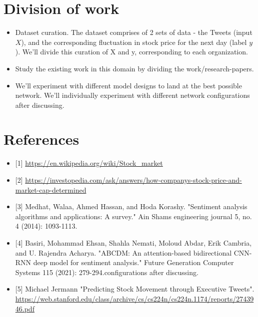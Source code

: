 \documentclass{article}
\begin{document}
\section{Division of work}
\begin{itemize}
    \item Dataset curation. The dataset comprises of 2 sets of data - the Tweets (input $X$), and the corresponding fluctuation in stock price for the next day (label $y$). We'll divide this curation of X and y, corresponding to each organization.
    \item Study the existing work in this domain by dividing the work/research-papers.
    \item We'll experiment with different model designs to land at the best possible network. We'll individually experiment with different network configurations after discussing.
\end{itemize}

\section{References}
\begin{itemize}
    \item {[1]} \url{https://en.wikipedia.org/wiki/Stock_market}
    \item {[2]} \url{https://investopedia.com/ask/answers/how-companys-stock-price-and-market-cap-determined}
    \item {[3]} Medhat, Walaa, Ahmed Hassan, and Hoda Korashy. "Sentiment analysis algorithms and applications: A survey." Ain Shams engineering journal 5, no. 4 (2014): 1093-1113.
    \item {[4]} Basiri, Mohammad Ehsan, Shahla Nemati, Moloud Abdar, Erik Cambria, and U. Rajendra Acharya. "ABCDM: An attention-based bidirectional CNN-RNN deep model for sentiment analysis." Future Generation Computer Systems 115 (2021): 279-294.configurations after discussing.
    \item {[5]} Michael Jermann "Predicting Stock Movement through Executive Tweets". \url{https://web.stanford.edu/class/archive/cs/cs224n/cs224n.1174/reports/2743946.pdf}
\end{itemize}
\end{document}
